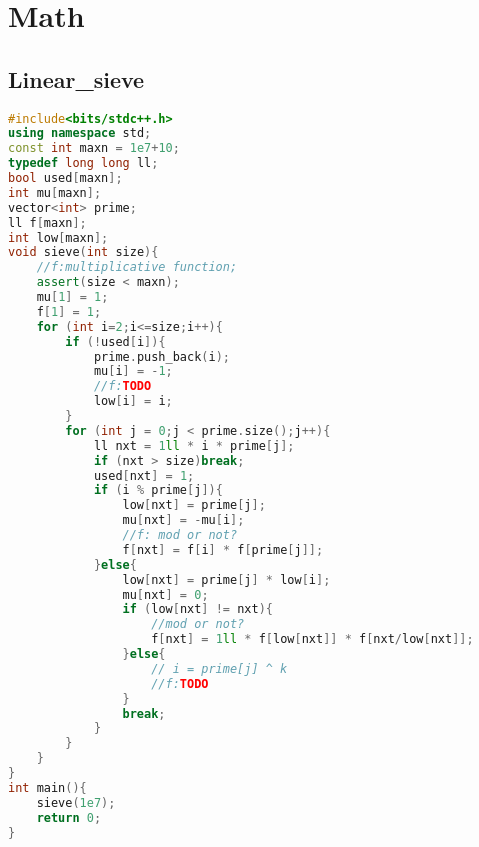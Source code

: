\section{Math}
\subsection{Linear_sieve}
\begin{lstlisting}[language=C++]
#include<bits/stdc++.h>
using namespace std;
const int maxn = 1e7+10;
typedef long long ll;
bool used[maxn];
int mu[maxn];
vector<int> prime;
ll f[maxn];
int low[maxn];
void sieve(int size){
    //f:multiplicative function;
    assert(size < maxn);
    mu[1] = 1;
    f[1] = 1;
    for (int i=2;i<=size;i++){
        if (!used[i]){
            prime.push_back(i);
            mu[i] = -1;
            //f:TODO
            low[i] = i;
        }
        for (int j = 0;j < prime.size();j++){
            ll nxt = 1ll * i * prime[j];
            if (nxt > size)break;
            used[nxt] = 1;
            if (i % prime[j]){
                low[nxt] = prime[j];
                mu[nxt] = -mu[i];
                //f: mod or not?
                f[nxt] = f[i] * f[prime[j]];
            }else{
                low[nxt] = prime[j] * low[i];
                mu[nxt] = 0;
                if (low[nxt] != nxt){
                    //mod or not?
                    f[nxt] = 1ll * f[low[nxt]] * f[nxt/low[nxt]];
                }else{
                    // i = prime[j] ^ k
                    //f:TODO
                }
                break;
            }
        }
    }
}
int main(){
    sieve(1e7);
    return 0;
}
\end{lstlisting}
